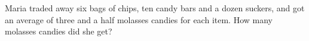 Maria traded away six bags of chips, ten candy bars and a dozen suckers, and got an average of three and a half molasses candies for each item. How many molasses candies did she get?
